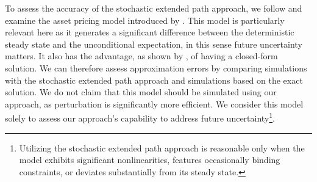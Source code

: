 \documentclass[a4paper,11pt]{amsart}
\begin{document}
To assess the accuracy of the stochastic extended path approach, we
follow \textcite{CollardJuillard2001} and
examine the asset pricing model introduced by
\textcite{Burnside1998}. This model is particularly relevant here as
it generates a significant difference between the deterministic steady
state and the unconditional expectation, in this sense future uncertainty
matters. It also has the advantage, as shown by
\textcite{Burnside1998}, of having a closed-form solution. We can
therefore assess approximation errors by comparing simulations with
the stochastic extended path approach and simulations based on the
exact solution. We do not claim that this model should be simulated
using our approach, as perturbation is significantly more
efficient. We consider this model solely to assess our approach's
capability to address future uncertainty\footnote{Utilizing the
   stochastic extended path approach is reasonable only when the model
   exhibits significant nonlinearities, features occasionally binding
   constraints, or deviates substantially from its steady
   state.}.\newline
\end{document}
